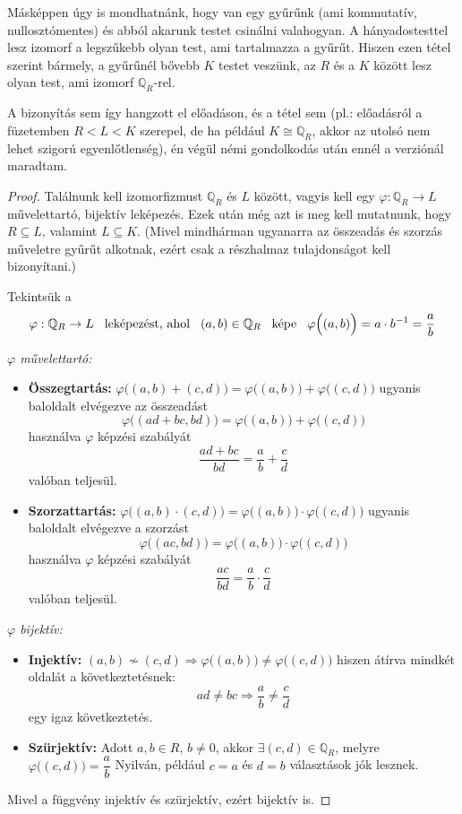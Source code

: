 \documentclass[12pt]{book}
\theoremstyle{plain} %
\theoremstyle{definition} %
\theoremstyle{remark}
\numberwithin{equation}{section}  %
\begin{document}
	Másképpen úgy is mondhatnánk, hogy van egy gyűrűnk (ami kommutatív, nullosztómentes) és abból akarunk testet csinálni valahogyan. A hányadostesttel lesz izomorf a legszűkebb olyan test, ami tartalmazza a gyűrűt. Hiszen ezen tétel szerint bármely, a gyűrűnél bővebb $K$ testet veszünk, az $R$ és a $K$ között lesz olyan test, ami izomorf $\mathbb{Q}_R$-rel.
	
	A bizonyítás sem így hangzott el előadáson, és a tétel sem (pl.: előadásról a füzetemben $R<L<K$ szerepel, de ha például $K\cong \mathbb{Q}_R$, akkor az utolsó nem lehet szigorú egyenlőtlenség), én végül némi gondolkodás után ennél a verziónál maradtam.
	
	\begin{proof}
		Találnunk kell izomorfizmust $\mathbb{Q}_R$ és $L$ között, vagyis kell egy $\varphi: \mathbb{Q}_R \to L$ művelettartó, bijektív leképezés. Ezek után még azt is meg kell mutatnunk, hogy $R\subseteq L$, valamint $L\subseteq K$. (Mivel mindhárman ugyanarra az összeadás és szorzás műveletre gyűrűt alkotnak, ezért csak a részhalmaz tulajdonságot kell bizonyítani.)
		
		Tekintsük a
		\[ \varphi: \mathbb{Q}_R \to L \hspace{3mm} \text{leképezést, ahol} \hspace{3mm} (a,b)\in \mathbb{Q}_R \hspace{3mm} \text{képe} \hspace{3mm} \varphi\Big((a,b)\Big) = a\cdot b^{-1} = \dfrac{a}{b} \]
		
		\textit{$\varphi$ művelettartó:}
		\begin{itemize}
			\item{\textbf{Összegtartás:} $\varphi\Big((a,b)+(c,d)\Big)=\varphi\Big((a,b)\Big)+\varphi\Big((c,d)\Big)$ ugyanis baloldalt elvégezve az összeadást
			\[ \varphi\Big((ad+bc,bd)\Big)=\varphi\Big((a,b)\Big)+\varphi\Big((c,d)\Big)  \]
			használva $\varphi$ képzési szabályát
			\[ \dfrac{ad+bc}{bd} = \dfrac{a}{b} + \dfrac{c}{d} \]
			valóban teljesül.	
			}
			\item{\textbf{Szorzattartás:} $\varphi\Big((a,b)\cdot (c,d)\Big)=\varphi\Big((a,b)\Big)\cdot \varphi\Big((c,d)\Big)$ ugyanis baloldalt elvégezve a szorzást
			\[ \varphi\Big((ac,bd)\Big)=\varphi\Big((a,b)\Big)\cdot \varphi\Big((c,d)\Big)  \]
			használva $\varphi$ képzési szabályát
			\[ \dfrac{ac}{bd} = \dfrac{a}{b} \cdot \dfrac{c}{d}  \]
			}
			valóban teljesül.
		\end{itemize}
		
		\textit{$\varphi$ bijektív:} 
		\begin{itemize}
			\item{ \textbf{Injektív:} $(a,b)\nsim (c,d) \Rightarrow \varphi\Big((a,b)\Big)\neq \varphi\Big((c,d)\Big)$
			hiszen átírva mindkét oldalát a következtetésnek:
			\[ ad\neq bc \Rightarrow \dfrac{a}{b} \neq \dfrac{c}{d}  \]
			egy igaz következtetés.
			}
			\item{\textbf{Szürjektív:} Adott $a,b\in R$, $b\neq 0$, akkor $\exists (c,d)\in \mathbb{Q}_R$, melyre $\varphi\Big((c,d)\Big)= \dfrac{a}{b}$}
			Nyilván, például $c=a$ és $d=b$ választások jók lesznek.
		\end{itemize}
		Mivel a függvény injektív és szürjektív, ezért bijektív is.
		

\end{proof}
\end{document}
